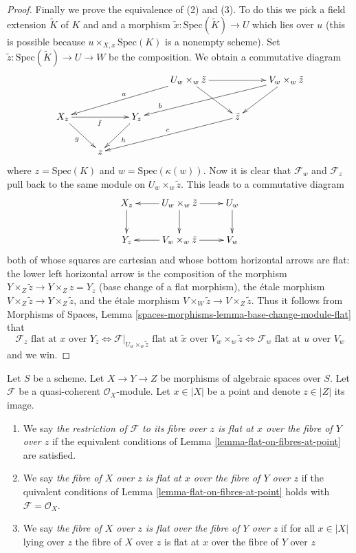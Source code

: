\begin{proof}
\medskip\noindent
Finally we prove the equivalence of (2) and (3).
To do this we pick a field extension $\tilde K$ of $K$ and
and a morphism $\tilde x : \text{Spec}(\tilde K) \to U$ which
lies over $u$ (this is possible because $u \times_{X, x} \text{Spec}(K)$
is a nonempty scheme). Set $\tilde z : \text{Spec}(\tilde K) \to U \to W$
be the composition. We obtain a commutative diagram
$$
\xymatrix{
& & & U_w \times_w \tilde z \ar[llld]_a \ar[rr] \ar[dr] & &
V_w \times_w \tilde z \ar[llld]_>>>>>>>b \ar[dl] \\
X_z \ar[rr]_f \ar[dr]_g & & Y_z \ar[dl]^h &  & \tilde z \ar[llld]_c \\
& z
}
$$
where $z = \text{Spec}(K)$ and $w = \text{Spec}(\kappa(w))$. Now it
is clear that $\mathcal{F}_w$ and $\mathcal{F}_z$ pull back to the
same module on $U_w \times_w \tilde z$. This leads to a commutative
diagram
$$
\xymatrix{
X_z \ar[d] & U_w \times_w \tilde z \ar[l] \ar[d] \ar[r] & U_w \ar[d] \\
Y_z & V_w \times_w \tilde z \ar[l] \ar[r] & V_w
}
$$
both of whose squares are cartesian and whose bottom horizontal
arrows are flat: the lower left horizontal arrow is the composition
of the morphism $Y \times_Z \tilde z \to Y \times_Z z = Y_z$ (base change
of a flat morphism), the \'etale morphism
$V \times_Z \tilde z \to Y \times_Z \tilde z$, and
the \'etale morphism $V \times_W \tilde z \to V \times_Z \tilde z$.
Thus it follows from
Morphisms of Spaces,
Lemma \ref{spaces-morphisms-lemma-base-change-module-flat}
that
$$
\mathcal{F}_z\text{ flat at }x\text{ over }Y_z
\Leftrightarrow
\mathcal{F}|_{U_w \times_w \tilde z}
\text{ flat at }\tilde x\text{ over }V_w \times_w \tilde z
\Leftrightarrow
\mathcal{F}_w\text{ flat at }u\text{ over }V_w
$$
and we win.
\end{proof}

\begin{definition}
\label{definition-module-flat-on-fibre}
Let $S$ be a scheme. Let $X \to Y \to Z$ be morphisms of algebraic
spaces over $S$. Let $\mathcal{F}$ be a quasi-coherent $\mathcal{O}_X$-module.
Let $x \in |X|$ be a point and denote $z \in |Z|$ its image.
\begin{enumerate}
\item We say {\it the restriction of $\mathcal{F}$ to its fibre over $z$
is flat at $x$ over the fibre of $Y$ over $z$} if the equivalent conditions of
Lemma \ref{lemma-flat-on-fibres-at-point}
are satisfied.
\item We say {\it the fibre of $X$ over $z$ is flat at $x$ over the fibre of
$Y$ over $z$} if the quivalent conditions of
Lemma \ref{lemma-flat-on-fibres-at-point}
holds with $\mathcal{F} = \mathcal{O}_X$.
\item We say {\it the fibre of $X$ over $z$ is flat over the fibre of $Y$
over $z$} if for all $x \in |X|$ lying over $z$ the fibre of $X$ over $z$
is flat at $x$ over the fibre of $Y$ over $z$
\end{enumerate}
\end{definition}

